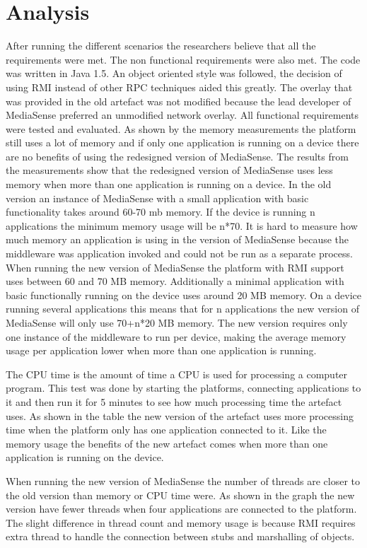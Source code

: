 \section{Analysis}
After running the different scenarios the researchers believe that all the requirements were met. The non functional requirements were also met. The code was written in Java 1.5. An object oriented style was followed, the decision of using RMI instead of other RPC techniques aided this greatly. The overlay that was provided in the old artefact was not modified because the lead developer of MediaSense preferred an unmodified network overlay. All functional requirements were tested and evaluated. As shown by the memory measurements the platform still uses a lot of memory and if only one application is running on a device there are no benefits of using the redesigned version of MediaSense. The results from the measurements show that the redesigned version of MediaSense uses less memory when more than one application is running on a device. In the old version an instance of MediaSense with a small application with basic functionality takes around 60-70 mb memory. If the device is running n applications the minimum memory usage will be n*70. It is hard to measure how much memory an application is using in the version of MediaSense because the middleware was application invoked and could not be run as a separate process. When running the new version of MediaSense the platform with RMI support uses between 60 and 70 MB memory. Additionally a minimal application with basic functionally running on the device uses around 20 MB memory. On a device running several applications this means that for n applications the new version of MediaSense will only use 70+n*20 MB memory. The new version requires only one instance of the middleware to run per device, making the average memory usage per application lower when more than one application is running.

The CPU time is the amount of time a CPU is used for processing a computer program. This test was done by starting the platforms, connecting applications to it and then run it for 5 minutes to see how much processing time the artefact uses. As shown in the table the new version of the artefact uses more processing time when the platform only has one application connected to it. Like the memory usage the benefits of the new artefact comes when more than one application is running on the device. 

When running the new version of MediaSense the number of threads are closer to the old version than memory or CPU time were. As shown in the graph the new version have fewer threads when four applications are connected to the platform. The slight difference in thread count and memory usage is because RMI requires extra thread to handle the connection between stubs and marshalling of objects. 

